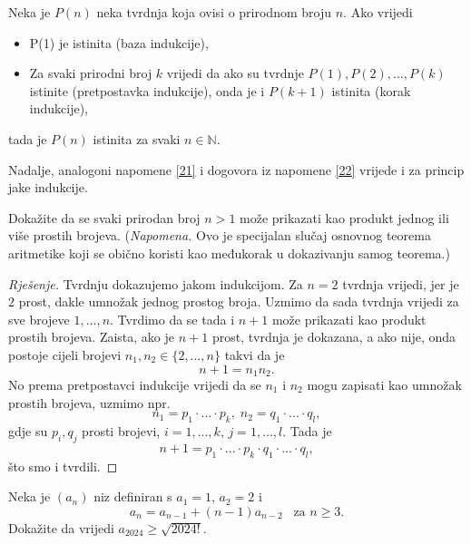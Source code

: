 \begin{remark}
Neka je $P(n)$ neka tvrdnja koja ovisi o prirodnom broju $n$. Ako vrijedi
\begin{itemize}
\item P(1) je istinita (baza indukcije),
\item Za svaki prirodni broj $k$ vrijedi da ako su tvrdnje $P(1), P(2), \dots, P(k)$ istinite (pretpostavka indukcije), onda je i $P(k+1)$ istinita (korak indukcije),
\end{itemize}
tada je $P(n)$ istinita za svaki $n\in \mathbb{N}$.
\end{remark}

Nadalje, analogoni napomene \ref{21} i dogovora iz napomene \ref{22} vrijede i za princip jake indukcije.

\begin{exercise}
\label{19}
Dokažite da se svaki prirodan broj $n>1$ može prikazati kao produkt jednog ili više prostih brojeva. (\textit{Napomena.} Ovo je specijalan slučaj osnovnog teorema aritmetike koji se obično koristi kao međukorak u dokazivanju samog teorema.)
\end{exercise}
\begin{proof}[Rješenje]
Tvrdnju dokazujemo jakom indukcijom. Za $n=2$ tvrdnja vrijedi, jer je $2$ prost, dakle umnožak jednog prostog broja. Uzmimo da sada tvrdnja vrijedi za sve brojeve $1, \dots, n$. Tvrdimo da se tada i $n+1$ može prikazati kao produkt prostih brojeva. Zaista, ako je $n+1$ prost, tvrdnja je dokazana, a ako nije, onda postoje cijeli brojevi $n_1, n_2\in \{2, \dots, n\}$ takvi da je $$n+1=n_1n_2.$$ No prema pretpostavci indukcije vrijedi da se $n_1$ i $n_2$ mogu zapisati kao umnožak prostih brojeva, uzmimo npr. 
$$n_1=p_1\cdot ...\cdot p_k,\; n_2=q_1\cdot... \cdot q_l,$$ gdje su $p_i, q_j$ prosti brojevi, $i=1,..., k$, $j=1,\dots, l$. Tada je $$n+1=p_1\cdot ...\cdot p_k\cdot q_1\cdot... \cdot q_l,$$ što smo i tvrdili.
\end{proof}
\begin{exercise}
Neka je $(a_n)$ niz definiran s $a_1=1$, $a_2=2$ i
$$a_n=a_{n-1}+(n-1)a_{n-2}\;\;\;\text{za } n\geq 3.$$
Dokažite da vrijedi $a_{2024}\geq \sqrt{2024!}$.
\end{exercise}
